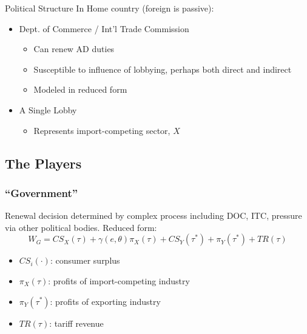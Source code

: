 \documentclass[handout]{beamer}
\newcommand{\ga}{\gamma}
\newcommand{\ta}{\theta}
\begin{document}
\begin{frame}{Political Structure}
In Home country (foreign is passive):
\pause
\begin{itemize}[<+->]
	\item Dept. of Commerce / Int'l Trade Commission
		\begin{itemize}[<+->]
			\item Can renew AD duties
			\item Susceptible to influence of lobbying, perhaps both direct and indirect
			\item Modeled in reduced form
		\end{itemize}
	\item A Single Lobby
		\begin{itemize}
			\item Represents import-competing sector, $X$
		\end{itemize}	
\end{itemize}

\end{frame}


\subsection{The Players}
\begin{frame}
\frametitle{``Government''}
\pause
Renewal decision determined by complex process including DOC, ITC, pressure via other political bodies. Reduced form:
\pause
\[
  W_G = \mathit{CS}_X(\tau) + \ga(e,\ta) \pi_X(\tau) + \mathit{CS}_Y(\tau^*) + \pi_Y(\tau^*) + \mathit{TR}(\tau)
\]

\pause
\begin{itemize}[<+->]
	\item $\mathit{CS_i(\cdot)}$: consumer surplus
	\item $\pi_X(\tau)$: profits of import-competing industry
	\item $\pi_Y(\tau^*)$: profits of exporting industry
	\item $\mathit{TR}(\tau)$: tariff revenue
\end{itemize}
\end{frame}
\end{document}
